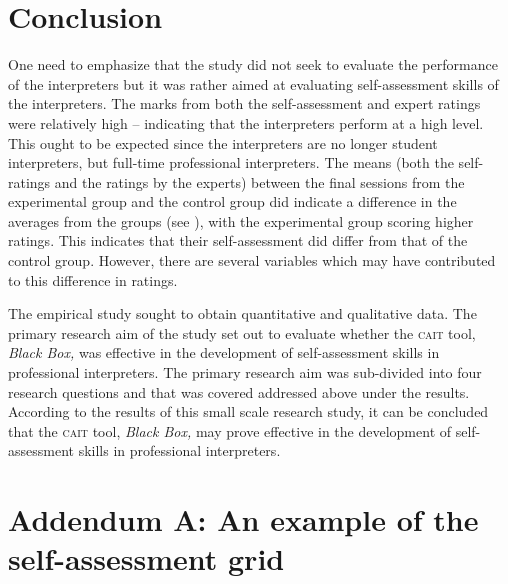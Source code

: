 \documentclass[output=paper]{langsci/langscibook}
\begin{document}
\section{Conclusion}

One need to emphasize that the study did not seek to evaluate the performance of the interpreters but it was rather aimed at evaluating self-assessment skills of the interpreters. The marks from both the self-assessment and expert ratings were relatively high --  indicating that the interpreters perform at a high level. This ought to be expected since the interpreters are no longer student interpreters, but full-time professional interpreters. The means (both the self-ratings and the ratings by the experts) between the final sessions from the experimental group and the control group did indicate a difference in the averages from the groups (see ), with the experimental group scoring higher ratings. This indicates that their self-assessment did differ from that of the control group. However, there are several variables which may have contributed to this difference in ratings.  

The empirical study sought to obtain quantitative and qualitative data. The primary research aim of the study set out to evaluate whether the \textsc{cait} tool, \textit{Black Box,} was effective in the development of self-assessment skills in professional interpreters. The primary research aim was sub-divided into four research questions and that was covered addressed above under the results. According to the results of this small scale research study, it can be concluded that the \textsc{cait} tool, \textit{Black Box,} may prove effective in the development of self-assessment skills in professional interpreters. 

\section*{Addendum A: An example of the self-assessment grid}
\label{03:addendum:A}
\renewcommand{\arraystretch}{2}
\newlength{\tablewidth}\setlength{\tablewidth}{20cm}
\newlength{\cellwidth}\setlength{\cellwidth}{0.033\tablewidth}
\newlength{\rowwidth}\setlength{\rowwidth}{30\cellwidth}
\end{document}
